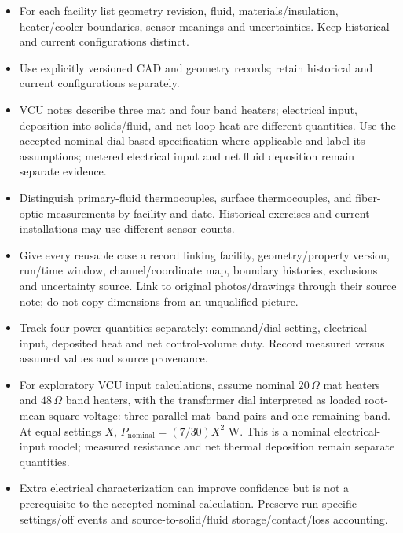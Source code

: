 \begin{itemize}[leftmargin=*]
\item For each facility list geometry revision, fluid, materials/\allowbreak{}insulation, heater/\allowbreak{}cooler boundaries, sensor meanings and uncertainties. Keep historical and current configurations distinct.
\item Use explicitly versioned CAD and geometry records; retain historical and current configurations separately.
\item VCU notes describe three mat and four band heaters; electrical input, deposition into solids/\allowbreak{}fluid, and net loop heat are different quantities. Use the accepted nominal dial-based specification where applicable and label its assumptions; metered electrical input and net fluid deposition remain separate evidence.
\item Distinguish primary-fluid thermocouples, surface thermocouples, and fiber-optic measurements by facility and date. Historical exercises and current installations may use different sensor counts.
\item Give every reusable case a record linking facility, geometry/\allowbreak{}property version, run/\allowbreak{}time window, channel/\allowbreak{}coordinate map, boundary histories, exclusions and uncertainty source. Link to original photos/\allowbreak{}drawings through their source note; do not copy dimensions from an unqualified picture.
\item Track four power quantities separately: command/\allowbreak{}dial setting, electrical input, deposited heat and net control-volume duty. Record measured versus assumed values and source provenance.\cite{jcgm2020measurementmodels}
\item For exploratory VCU input calculations, assume nominal $20\,\Omega$ mat heaters and $48\,\Omega$ band heaters, with the transformer dial interpreted as loaded root-mean-square voltage: three parallel mat--band pairs and one remaining band. At equal settings $X$, $P_{\mathrm{nominal}}=(7/30)X^2$ W. This is a nominal electrical-input model; measured resistance and net thermal deposition remain separate quantities.
\item Extra electrical characterization can improve confidence but is not a prerequisite to the accepted nominal calculation. Preserve run-specific settings/\allowbreak{}off events and source-to-solid/\allowbreak{}fluid storage/\allowbreak{}contact/\allowbreak{}loss accounting.
\end{itemize}

